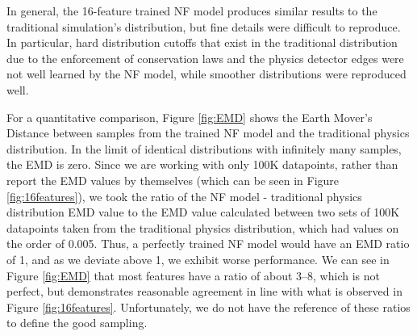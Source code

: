 In general, the 16-feature trained NF model produces similar results to the traditional simulation's distribution, but fine details were difficult to reproduce. In particular, hard distribution cutoffs that exist in the traditional distribution due to the enforcement of conservation laws and the physics detector edges were not well learned by the NF model, while smoother distributions were reproduced well.

For a quantitative comparison, Figure \ref{fig:EMD} shows the Earth Mover's Distance between samples from the trained NF model and the traditional physics distribution. In the limit of identical distributions with infinitely many samples, the EMD is zero. Since we are working with only 100K datapoints, rather than report the EMD values by themselves (which can be seen in Figure \ref{fig:16features}), we took the ratio of the NF model - traditional physics distribution EMD value to the EMD value calculated between two sets of 100K datapoints taken from the traditional physics distribution, which had values on the order of 0.005. Thus, a perfectly trained NF model would have an EMD ratio of 1, and as we deviate above 1, we exhibit worse performance. We can see in Figure \ref{fig:EMD} that most features have a ratio of about 3--8, which is not perfect, but demonstrates reasonable agreement in line with what is observed in Figure \ref{fig:16features}. Unfortunately, we do not have the reference of these ratios to define the good sampling.

